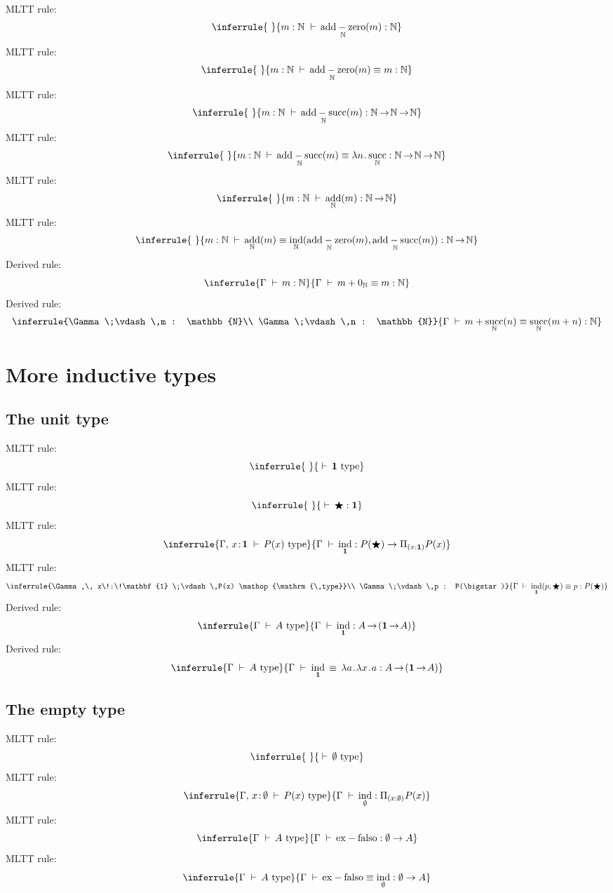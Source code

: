 \documentclass[12pt]{article}
\renewcommand{\.}{\hskip 0.7pt}
\renewcommand{\d}{\;\vdash\,}
\renewcommand{\r}{\!\.\rightarrow\!}
\DeclareMathOperator{\type}{\,type}
\newcommand{\N}{\mathbb{N}}
\DeclareMathOperator{\s}{succ}
\DeclareMathOperator{\ind}{ind}
\DeclareMathOperator{\add}{add}
\DeclareMathOperator{\addz}{add-zero}
\DeclareMathOperator{\adds}{add-succ}
\DeclareMathOperator{\exfalso}{ex-falso}
\begin{document}
MLTT rule:
$$\inferrule
{~}
{m : \N \d \addz_\N(m) : \N}
$$
MLTT rule:
$$\inferrule
{~}
{m : \N \d \addz_\N(m) \equiv m : \N}
$$
MLTT rule:
$$\inferrule
{~}
{m : \N \d \adds_\N(m) : \N \r \N \r \N}
$$
MLTT rule:
$$\inferrule
{~}
{m : \N \d \adds_\N(m) \equiv \lambda n \.. \s_\N : \N \r \N \r \N}
$$
MLTT rule:
$$\inferrule
{~}
{m : \N \d \add_\N(m) : \N \r \N}
$$
MLTT rule:
$$\inferrule
{~}
{m : \N \d \add_\N(m) \equiv \ind_\N(\addz_\N(m), \adds_\N(m)) : \N \r \N}
$$
Derived rule:
$$\inferrule
{\Gamma \d m : \N}
{\Gamma \d m + 0_\N \equiv m : \N}
$$
Derived rule:
$$\inferrule
{\Gamma \d m : \N \\ \Gamma \d n : \N}
{\Gamma \d m + \s_\N(n) \equiv \s_\N(m+n) : \N}
$$

\section{More inductive types}

\subsection{The unit type}

MLTT rule:
$$\inferrule
{~}
{\d \mathbf{1} \type}
$$
MLTT rule:
$$\inferrule
{~}
{\d \bigstar : \mathbf{1}}
$$
MLTT rule:
$$\inferrule
{\Gamma,\, x\!:\!\mathbf{1} \d P(x) \type}
{\Gamma \d \ind_\mathbf{1} : P(\bigstar) \rightarrow \Pi_{(x:\mathbf{1})}P(x)}
$$
MLTT rule:
$$\inferrule
{\Gamma,\, x\!:\!\mathbf{1} \d P(x) \type \\ \Gamma \d p : P(\bigstar)}
{\Gamma \d \ind_\mathbf{1}(p,\bigstar) \equiv p : P(\bigstar)}
$$
Derived rule:
$$\inferrule
{\Gamma \d A \type}
{\Gamma \d \ind_\mathbf{1} : A \r (\mathbf{1} \r A)}
$$
Derived rule:
$$\inferrule
{\Gamma \d A \type}
{\Gamma \d\. \ind_\mathbf{1} \,\equiv\, \lambda a \..\. \lambda x \..\. a : A \r (\mathbf{1} \r A)}
$$

\subsection{The empty type}

MLTT rule:
$$\inferrule
{~}
{\d \emptyset \type}
$$
MLTT rule:
$$\inferrule
{\Gamma,\, x\!:\!\.\emptyset \d P(x) \type}
{\Gamma \d \ind_\emptyset : \Pi_{(x:\emptyset)}P(x)}
$$
MLTT rule:
$$\inferrule
{\Gamma \d A \type}
{\Gamma \d \exfalso : \emptyset \rightarrow A}
$$
MLTT rule:
$$\inferrule
{\Gamma \d A \type}
{\Gamma \d \exfalso \equiv \ind_\emptyset : \emptyset \rightarrow A}
$$
\end{document}
